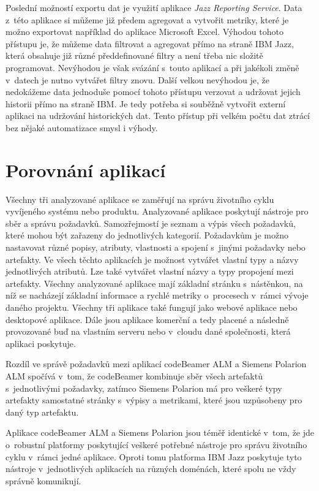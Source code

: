 \documentclass[czech,master]{diploma}
\begin{document}
Poslední možností exportu dat je využití aplikace \textit{Jazz Reporting Service}. Data z~této aplikace si můžeme již předem agregovat a vytvořit metriky, které je možno exportovat například do aplikace Microsoft Excel. Výhodou tohoto přístupu je, že můžeme data filtrovat a agregovat přímo na straně IBM Jazz, která obsahuje již různé předdefinované filtry a není třeba nic složitě programovat. Nevýhodou je však svázání s~touto aplikací a při jakékoli změně v~datech je nutno vytvářet filtry znovu. Další velkou nevýhodou je, že nedokážeme data jednoduše pomocí tohoto přístupu verzovat a udržovat jejich historii přímo na straně IBM. Je tedy potřeba si souběžně vytvořit externí aplikaci na udržování historických dat. Tento přístup při velkém počtu dat ztrácí bez nějaké automatizace smysl i výhody.

\section{Porovnání aplikací}
Všechny tři analyzované aplikace se zaměřují na správu životního cyklu vyvíjeného systému nebo produktu. Analyzované aplikace poskytují nástroje pro sběr a správu požadavků. Samozřejmostí je seznam a výpis všech požadavků, které mohou být zařazeny do jednotlivých kategorií. Požadavkům je možno nastavovat různé popisy, atributy, vlastnosti a spojení s~jinými požadavky nebo artefakty. Ve všech těchto aplikacích je možnost vytvářet vlastní typy a názvy jednotlivých atributů. Lze také vytvářet vlastní názvy a typy propojení mezi artefakty. Všechny analyzované aplikace mají základní stránku s~nástěnkou, na níž se nacházejí základní informace a rychlé metriky o~procesech v~rámci vývoje daného projektu. Všechny tři aplikace také fungují jako webové aplikace nebo desktopové aplikace. Dále jsou aplikace komerční a tedy placené a následně provozované buď na vlastním serveru nebo v~cloudu dané společnosti, která aplikaci poskytuje.

Rozdíl ve správě požadavků mezi aplikací codeBeamer ALM a Siemens Polarion ALM spočívá v~tom, že codeBeamer kombinuje sběr všech artefaktů s~jednotlivými požadavky, zatímco Siemens Polarion má pro veškeré typy artefakty samostatné stránky s~výpisy a metrikami, které jsou uzpůsobeny pro daný typ artefaktu.

Aplikace codeBeamer ALM a Siemens Polarion jsou téměř identické v~tom, že jde o~robustní platformy poskytující veškeré potřebné nástroje pro správu životního cyklu v~rámci jedné aplikace. Oproti tomu platforma IBM Jazz poskytuje tyto nástroje v~jednotlivých aplikacích na různých doménách, které spolu ne vždy správně komunikují.
\end{document}
